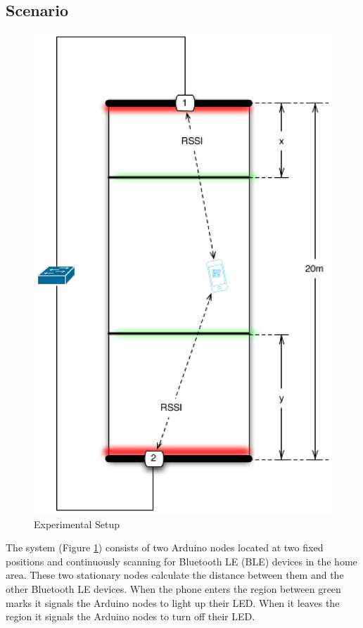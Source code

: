 \documentclass[conference,a4paper]{../../sty/IEEEtran}
\begin{document}
\subsection{Scenario}

\begin{figure}[h!]
\centering
\includegraphics[scale=0.5]{position.eps}
\caption{Experimental Setup}
\label{fig1}
\end{figure}

The system (Figure \ref{fig1}) consists of two Arduino nodes located at two fixed positions and continuously scanning for Bluetooth LE (BLE) devices in the home area. These two stationary nodes calculate the distance between them and the other Bluetooth LE devices.
When the phone enters the region between green marks it signals the Arduino nodes to light up their LED.
When it leaves the region it signals the Arduino nodes to turn off their LED.
\end{document}
